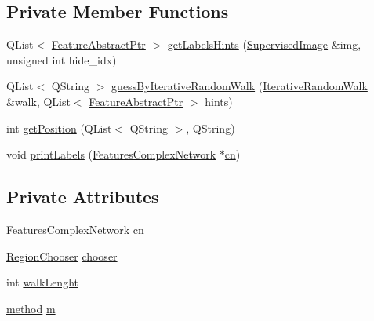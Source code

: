 \subsection*{Private Member Functions}
\begin{DoxyCompactItemize}
\item 
Q\+List$<$ \hyperlink{class_feature_abstract_ptr}{Feature\+Abstract\+Ptr} $>$ \hyperlink{class_label_guesser_experiment_a7ce6e72a0299f09f5d60911b6b2458b4}{get\+Labels\+Hints} (\hyperlink{class_supervised_image}{Supervised\+Image} \&img, unsigned int hide\+\_\+idx)
\item 
Q\+List$<$ Q\+String $>$ \hyperlink{class_label_guesser_experiment_a699627db61bd5c21220e2306e9ee6f32}{guess\+By\+Iterative\+Random\+Walk} (\hyperlink{class_iterative_random_walk}{Iterative\+Random\+Walk} \&walk, Q\+List$<$ \hyperlink{class_feature_abstract_ptr}{Feature\+Abstract\+Ptr} $>$ hints)
\item 
int \hyperlink{class_label_guesser_experiment_ae0a57bb59569d9bc69363a68f888f646}{get\+Position} (Q\+List$<$ Q\+String $>$, Q\+String)
\item 
void \hyperlink{class_label_guesser_experiment_a835363da6b06ec1402823493ef933179}{print\+Labels} (\hyperlink{class_features_complex_network}{Features\+Complex\+Network} $\ast$\hyperlink{class_label_guesser_experiment_a94903226a99f02913d3e104ccc510880}{cn})
\end{DoxyCompactItemize}
\subsection*{Private Attributes}
\begin{DoxyCompactItemize}
\item 
\hyperlink{class_features_complex_network}{Features\+Complex\+Network} \hyperlink{class_label_guesser_experiment_a94903226a99f02913d3e104ccc510880}{cn}
\item 
\hyperlink{class_region_chooser}{Region\+Chooser} \hyperlink{class_label_guesser_experiment_a76efedf726d4e95b9c8b2caff4b563cf}{chooser}
\item 
int \hyperlink{class_label_guesser_experiment_a5038af94a1310577da234f589c19c77e}{walk\+Lenght}
\item 
\hyperlink{class_label_guesser_experiment_a8c3db06a56bf1ad7513c20a7b80da3ec}{method} \hyperlink{class_label_guesser_experiment_a0a0032a29818ba490865d85ac1403b0d}{m}
\end{DoxyCompactItemize}


